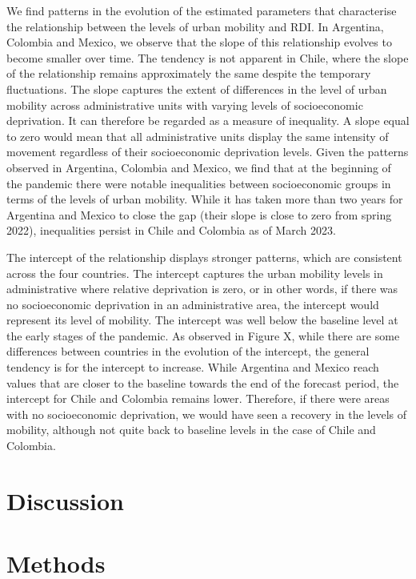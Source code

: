 \documentclass[
  11pt,
]{article}
\begin{document}
We find patterns in the evolution of the estimated parameters that
characterise the relationship between the levels of urban mobility and
RDI. In Argentina, Colombia and Mexico, we observe that the slope of
this relationship evolves to become smaller over time. The tendency is
not apparent in Chile, where the slope of the relationship remains
approximately the same despite the temporary fluctuations. The slope
captures the extent of differences in the level of urban mobility across
administrative units with varying levels of socioeconomic deprivation.
It can therefore be regarded as a measure of inequality. A slope equal
to zero would mean that all administrative units display the same
intensity of movement regardless of their socioeconomic deprivation
levels. Given the patterns observed in Argentina, Colombia and Mexico,
we find that at the beginning of the pandemic there were notable
inequalities between socioeconomic groups in terms of the levels of
urban mobility. While it has taken more than two years for Argentina and
Mexico to close the gap (their slope is close to zero from spring 2022),
inequalities persist in Chile and Colombia as of March 2023.

The intercept of the relationship displays stronger patterns, which are
consistent across the four countries. The intercept captures the urban
mobility levels in administrative where relative deprivation is zero, or
in other words, if there was no socioeconomic deprivation in an
administrative area, the intercept would represent its level of
mobility. The intercept was well below the baseline level at the early
stages of the pandemic. As observed in Figure X, while there are some
differences between countries in the evolution of the intercept, the
general tendency is for the intercept to increase. While Argentina and
Mexico reach values that are closer to the baseline towards the end of
the forecast period, the intercept for Chile and Colombia remains lower.
Therefore, if there were areas with no socioeconomic deprivation, we
would have seen a recovery in the levels of mobility, although not quite
back to baseline levels in the case of Chile and Colombia.

\hypertarget{sec-discussion}{%
\section{Discussion}\label{sec-discussion}}

\hypertarget{sec-methods}{%
\section{Methods}\label{sec-methods}}
\end{document}
